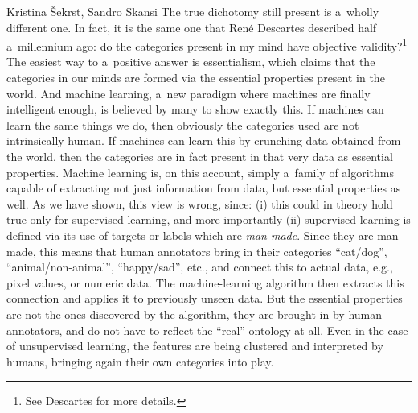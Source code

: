 \begin{artengenv2auth}{Kristina Šekrst, Sandro Skansi}
The true dichotomy still present is a~wholly different one. In fact, it is the same one that René Descartes described half a~millennium ago: do the categories present in my mind have objective validity?\footnote{See Descartes
\parencites*[][]{descartes_renati_1641}[English translation:][]{descartes_meditations_1991} %
 for more details.} The easiest way to a~positive answer is essentialism, which claims that the categories in our minds are formed via the essential properties present in the world. And machine learning, a~new paradigm where machines are finally intelligent enough, is believed by many to show exactly this. If machines can learn the same things we do, then obviously the categories used are not intrinsically human. If machines can learn this by crunching data obtained from the world, then the categories are in fact present in that very data as essential properties. Machine learning is, on this account, simply a~family of algorithms capable of extracting not just information from data, but essential properties as well. As we have shown, this view is wrong, since: (i) this could in theory hold true only for supervised learning, and more importantly (ii) supervised learning is defined via its use of targets or labels which are \textit{man-made}. Since they are man-made, this means that human annotators bring in their categories ``cat/dog'', ``animal/non-animal'', ``happy/sad'', etc., and connect this to actual data, e.g., pixel values, or numeric data. The machine-learning algorithm then extracts this connection and applies it to previously unseen data. But the essential properties are not the ones discovered by the algorithm, they are brought in by human annotators, and do not have to reflect the ``real'' ontology at all. Even in the case of unsupervised learning, the features are being clustered and interpreted by humans, bringing again their own categories into play.


\end{artengenv2auth}
